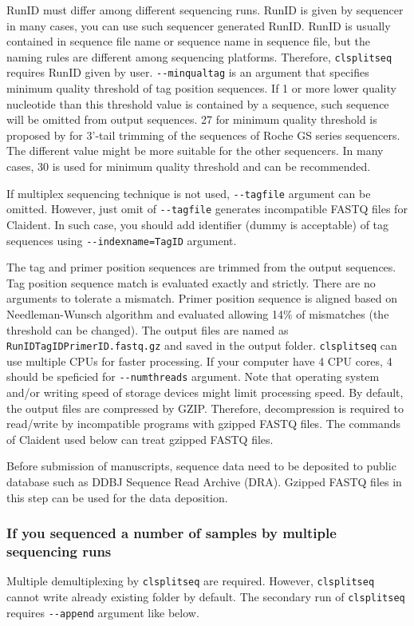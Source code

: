 \documentclass[titlepage,10pt,a4paper,english]{jsbook}
\begin{document}
RunID must differ among different sequencing runs.
RunID is given by sequencer in many cases, you can use such sequencer generated RunID.
RunID is usually contained in sequence file name or sequence name in sequence file, but the naming rules are different among sequencing platforms.
Therefore, \texttt{clsplitseq} requires RunID given by user.
\texttt{{-}{-}minqualtag} is an argument that specifies minimum quality threshold of tag position sequences.
If 1 or more lower quality nucleotide than this threshold value is contained by a sequence, such sequence will be omitted from output sequences.
27 for minimum quality threshold is proposed by \citet{Kunin2010} for 3'-tail trimming of the sequences of Roche GS series sequencers.
The different value might be more suitable for the other sequencers.
In many cases, 30 is used for minimum quality threshold and can be recommended.

If multiplex sequencing technique is not used, \texttt{{-}{-}tagfile} argument can be omitted.
However, just omit of \texttt{{-}{-}tagfile} generates incompatible FASTQ files for Claident.
In such case, you should add identifier (dummy is acceptable) of tag sequences using \texttt{{-}{-}indexname=TagID} argument.

The tag and primer position sequences are trimmed from the output sequences.
Tag position sequence match is evaluated exactly and strictly.
There are no arguments to tolerate a mismatch.
Primer position sequence is aligned based on Needleman-Wunsch algorithm and evaluated allowing 14\% of mismatches (the threshold can be changed).
The output files are named as \texttt{RunID{\textunderscore}{\textunderscore}TagID{\textunderscore}{\textunderscore}PrimerID.fastq.gz} and saved in the output folder.
\texttt{clsplitseq} can use multiple CPUs for faster processing.
If your computer have 4 CPU cores, 4 should be speficied for \texttt{{-}{-}numthreads} argument.
Note that operating system and/or writing speed of storage devices might limit processing speed.
By default, the output files are compressed by GZIP.
Therefore, decompression is required to read/write by incompatible programs with gzipped FASTQ files.
The commands of Claident used below can treat gzipped FASTQ files.

Before submission of manuscripts, sequence data need to be deposited to public database such as DDBJ Sequence Read Archive (DRA).
Gzipped FASTQ files in this step can be used for the data deposition.

\subsubsection{If you sequenced a number of samples by multiple sequencing runs}
Multiple demultiplexing by \texttt{clsplitseq} are required.
However, \texttt{clsplitseq} cannot write already existing folder by default.
The secondary run of \texttt{clsplitseq} requires \texttt{{-}{-}append} argument like below.
\end{document}

